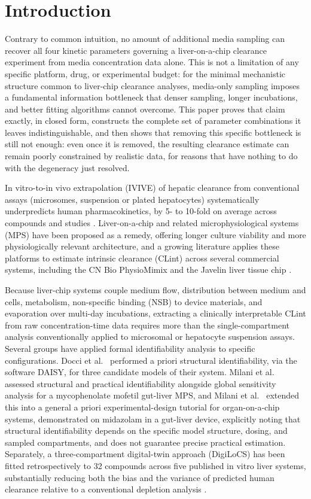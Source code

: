 \section*{Introduction}

Contrary to common intuition, no amount of additional media sampling can recover all four kinetic parameters governing a liver-on-a-chip clearance experiment from media concentration data alone. This is not a limitation of any specific platform, drug, or experimental budget: for the minimal mechanistic structure common to liver-chip clearance analyses, media-only sampling imposes a fundamental information bottleneck that denser sampling, longer incubations, and better fitting algorithms cannot overcome. This paper proves that claim exactly, in closed form, constructs the complete set of parameter combinations it leaves indistinguishable, and then shows that removing this specific bottleneck is still not enough: even once it is removed, the resulting clearance estimate can remain poorly constrained by realistic data, for reasons that have nothing to do with the degeneracy just resolved.

In vitro-to-in vivo extrapolation (IVIVE) of hepatic clearance from conventional assays (microsomes, suspension or plated hepatocytes) systematically underpredicts human pharmacokinetics, by 5- to 10-fold on average across compounds and studies \citep{hallifax2010}. Liver-on-a-chip and related microphysiological systems (MPS) have been proposed as a remedy, offering longer culture viability and more physiologically relevant architecture, and a growing literature applies these platforms to estimate intrinsic clearance (CLint) across several commercial systems, including the CN Bio PhysioMimix \citep{docci2022,tsamandouras2017} and the Javelin liver tissue chip \citep{rajan2023}.

Because liver-chip systems couple medium flow, distribution between medium and cells, metabolism, non-specific binding (NSB) to device materials, and evaporation over multi-day incubations, extracting a clinically interpretable CLint from raw concentration-time data requires more than the single-compartment analysis conventionally applied to microsomal or hepatocyte suspension assays. Several groups have applied formal identifiability analysis to specific configurations. Docci et al.\ \citep{docci2022} performed a priori structural identifiability, via the software DAISY, for three candidate models of their system. Milani et al.\ \citep{milani2022} assessed structural and practical identifiability alongside global sensitivity analysis for a mycophenolate mofetil gut-liver MPS, and Milani et al.\ \citep{milani2024} extended this into a general a priori experimental-design tutorial for organ-on-a-chip systems, demonstrated on midazolam in a gut-liver device, explicitly noting that structural identifiability depends on the specific model structure, dosing, and sampled compartments, and does not guarantee precise practical estimation. Separately, a three-compartment digital-twin approach (DigiLoCS) has been fitted retrospectively to 32 compounds across five published in vitro liver systems, substantially reducing both the bias and the variance of predicted human clearance relative to a conventional depletion analysis \citep{aravindakshan2025}.


